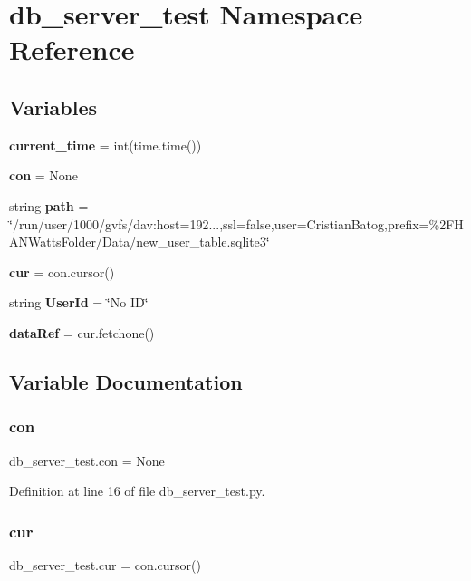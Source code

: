 \section{db\+\_\+server\+\_\+test Namespace Reference}
\label{namespacedb__server__test}
\subsection*{Variables}
\begin{DoxyCompactItemize}
\item 
\textbf{ current\+\_\+time} = int(time.\+time())
\item 
\textbf{ con} = None
\item 
string \textbf{ path} = \char`\"{}/run/user/1000/gvfs/dav\+:host=192...,ssl=false,user=Cristian\+Batog,prefix=\%2\+F\+H\+A\+N\+Watts\+Folder/\+Data/new\+\_\+user\+\_\+table.\+sqlite3\char`\"{}
\item 
\textbf{ cur} = con.\+cursor()
\item 
string \textbf{ User\+Id} = \char`\"{}No ID\char`\"{}
\item 
\textbf{ data\+Ref} = cur.\+fetchone()
\end{DoxyCompactItemize}


\subsection{Variable Documentation}
\mbox{\label{namespacedb__server__test_a545b8ac28ad5b2b3b9b2e4f506c32ab1}} 
\subsubsection{con}
{\footnotesize\ttfamily db\+\_\+server\+\_\+test.\+con = None}



Definition at line 16 of file db\+\_\+server\+\_\+test.\+py.

\mbox{\label{namespacedb__server__test_ab21e0238c77886616f09ce4256936c39}} 
\subsubsection{cur}
{\footnotesize\ttfamily db\+\_\+server\+\_\+test.\+cur = con.\+cursor()}



